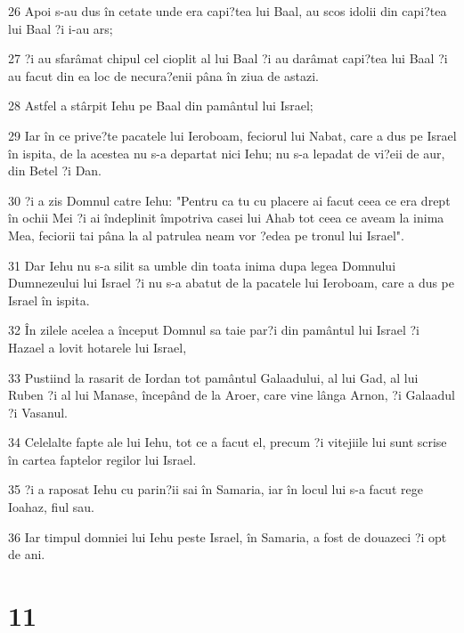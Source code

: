 \par 26 Apoi s-au dus în cetate unde era capi?tea lui Baal, au scos idolii din capi?tea lui Baal ?i i-au ars;
\par 27 ?i au sfarâmat chipul cel cioplit al lui Baal ?i au darâmat capi?tea lui Baal ?i au facut din ea loc de necura?enii pâna în ziua de astazi.
\par 28 Astfel a stârpit Iehu pe Baal din pamântul lui Israel;
\par 29 Iar în ce prive?te pacatele lui Ieroboam, feciorul lui Nabat, care a dus pe Israel în ispita, de la acestea nu s-a departat nici Iehu; nu s-a lepadat de vi?eii de aur, din Betel ?i Dan.
\par 30 ?i a zis Domnul catre Iehu: "Pentru ca tu cu placere ai facut ceea ce era drept în ochii Mei ?i ai îndeplinit împotriva casei lui Ahab tot ceea ce aveam la inima Mea, feciorii tai pâna la al patrulea neam vor ?edea pe tronul lui Israel".
\par 31 Dar Iehu nu s-a silit sa umble din toata inima dupa legea Domnului Dumnezeului lui Israel ?i nu s-a abatut de la pacatele lui Ieroboam, care a dus pe Israel în ispita.
\par 32 În zilele acelea a început Domnul sa taie par?i din pamântul lui Israel ?i Hazael a lovit hotarele lui Israel,
\par 33 Pustiind la rasarit de Iordan tot pamântul Galaadului, al lui Gad, al lui Ruben ?i al lui Manase, începând de la Aroer, care vine lânga Arnon, ?i Galaadul ?i Vasanul.
\par 34 Celelalte fapte ale lui Iehu, tot ce a facut el, precum ?i vitejiile lui sunt scrise în cartea faptelor regilor lui Israel.
\par 35 ?i a raposat Iehu cu parin?ii sai în Samaria, iar în locul lui s-a facut rege Ioahaz, fiul sau.
\par 36 Iar timpul domniei lui Iehu peste Israel, în Samaria, a fost de douazeci ?i opt de ani.

\chapter{11}

